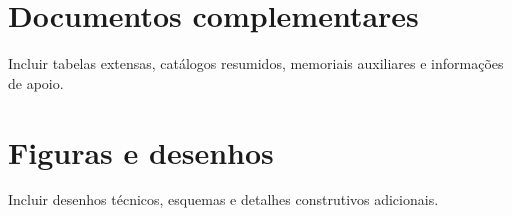 \section{Documentos complementares}
Incluir tabelas extensas, catálogos resumidos, memoriais auxiliares e informações de apoio.

\section{Figuras e desenhos}
Incluir desenhos técnicos, esquemas e detalhes construtivos adicionais.
